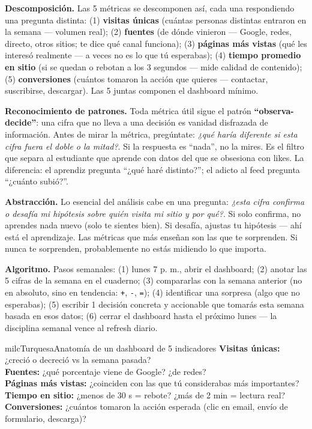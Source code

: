 \documentclass[11pt,letterpaper]{article}
\newcommand{\milcpaso}[3]{%
\Needspace{4\baselineskip}%
\begin{tcolorbox}[enhanced,colback=white,colframe=milcLinea,arc=1.5mm,boxrule=.9pt,
  left=14mm,right=4mm,top=3mm,bottom=3mm,before skip=4pt,after skip=4pt,
  fontupper=\RaggedRight,
  overlay={\node[anchor=north west,circle,fill=#2,text=white,inner sep=0pt,
    minimum size=7.4mm,font=\sffamily\bfseries\small]
    at ([xshift=3.6mm,yshift=-3.2mm]frame.north west) {#1};}]
#3
\end{tcolorbox}}
\begin{document}
\milcpaso{1}{milcTurquesa}{\textbf{Descomposición.} Las 5 métricas se descomponen así, cada una respondiendo una pregunta distinta: (1) \textbf{visitas únicas} (cuántas personas distintas entraron en la semana --- volumen real); (2) \textbf{fuentes} (de dónde vinieron --- Google, redes, directo, otros sitios; te dice qué canal funciona); (3) \textbf{páginas más vistas} (qué les interesó realmente --- a veces no es lo que tú esperabas); (4) \textbf{tiempo promedio en sitio} (si se quedan o rebotan a los 3 segundos --- mide calidad de contenido); (5) \textbf{conversiones} (cuántos tomaron la acción que quieres --- contactar, suscribirse, descargar). Las 5 juntas componen el dashboard mínimo.}
\milcpaso{2}{milcTurquesa}{\textbf{Reconocimiento de patrones.} Toda métrica útil sigue el patrón \textbf{``observa-decide''}: una cifra que no lleva a una decisión es vanidad disfrazada de información. Antes de mirar la métrica, pregúntate: \emph{¿qué haría diferente si esta cifra fuera el doble o la mitad?}. Si la respuesta es ``nada'', no la mires. Es el filtro que separa al estudiante que aprende con datos del que se obsesiona con likes. La diferencia: el aprendiz pregunta ``¿qué haré distinto?''; el adicto al feed pregunta ``¿cuánto subió?''.}
\milcpaso{3}{milcTurquesa}{\textbf{Abstracción.} Lo esencial del análisis cabe en una pregunta: \emph{¿esta cifra confirma o desafía mi hipótesis sobre quién visita mi sitio y por qué?}. Si solo confirma, no aprendes nada nuevo (solo te sientes bien). Si desafía, ajustas tu hipótesis --- ahí está el aprendizaje. Las métricas que más enseñan son las que te sorprenden. Si nunca te sorprenden, probablemente no estás midiendo lo que importa.}
\milcpaso{4}{milcTurquesa}{\textbf{Algoritmo.} Pasos semanales: (1) lunes 7 p. m., abrir el dashboard; (2) anotar las 5 cifras de la semana en el cuaderno; (3) compararlas con la semana anterior (no en absoluto, sino en tendencia: \texttt{+}, \texttt{-}, \texttt{=}); (4) identificar una sorpresa (algo que no esperabas); (5) escribir 1 decisión concreta y accionable que tomarás esta semana basada en esos datos; (6) cerrar el dashboard hasta el próximo lunes --- la disciplina semanal vence al refresh diario.}

\begin{drawbox}{milcTurquesa}{Anatomía de un dashboard de 5 indicadores}
\textbf{Visitas únicas:} ¿creció o decreció vs la semana pasada? \\[1mm] \textbf{Fuentes:} ¿qué porcentaje viene de Google? ¿de redes? \\[1mm] \textbf{Páginas más vistas:} ¿coinciden con las que tú considerabas más importantes? \\[1mm] \textbf{Tiempo en sitio:} ¿menos de 30 s = rebote? ¿más de 2 min = lectura real? \\[1mm] \textbf{Conversiones:} ¿cuántos tomaron la acción esperada (clic en email, envío de formulario, descarga)?
\end{drawbox}
\end{document}

